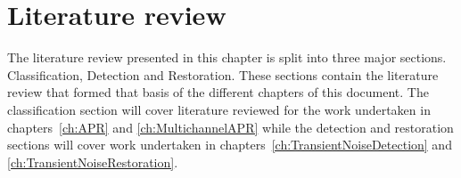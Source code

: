 \chapter{Literature review}\label{ch:LiteratureReview}

\ifpdf
    \graphicspath{{Chapter2_LitReview/Chapter2Figs/PNG/}{Chapter2_LitReview/Chapter2Figs/PDF/}{Chapter2_LitReview/Chapter2Figs/}{Chapter2_LitReview/Chapter2Figs/Classification/}{Chapter2_LitReview/Chapter2Figs/Detection/}{Chapter2_LitReview/Chapter2Figs/Restoration}}
\else
    \graphicspath{{Chapter2_LitReview/Chapter2Figs/EPS/}{Chapter2_LitReview/Chapter2Figs/}}
\fi

The literature review presented in this chapter is split into three major sections. Classification, Detection and Restoration. These sections contain the literature review that formed that basis of the different chapters of this document. The classification section will cover literature reviewed for the work undertaken in chapters~\ref{ch:APR} and \ref{ch:MultichannelAPR} while the detection and restoration sections will cover work undertaken in chapters~\ref{ch:TransientNoiseDetection} and \ref{ch:TransientNoiseRestoration}.

